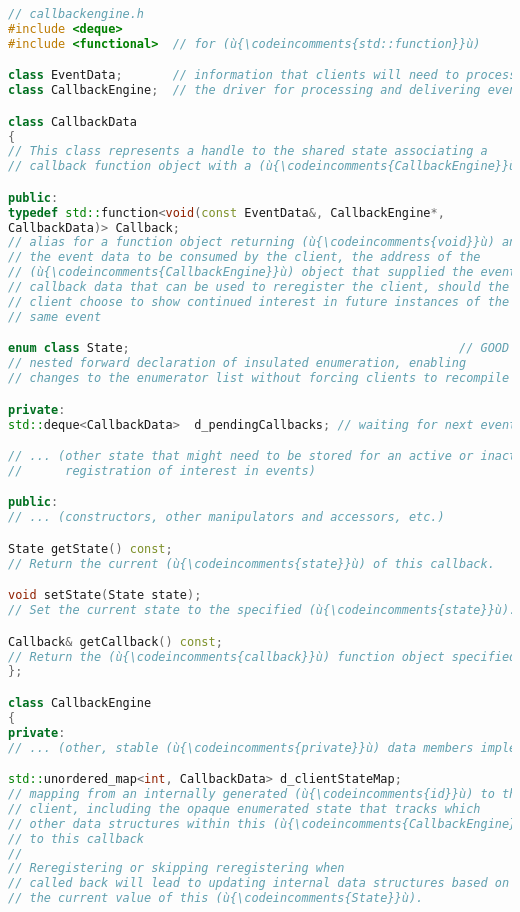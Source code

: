 \begin{lstlisting}[language=C++]
// callbackengine.h
#include <deque>
#include <functional>  // for (ù{\codeincomments{std::function}}ù)

class EventData;       // information that clients will need to process an event
class CallbackEngine;  // the driver for processing and delivering events

class CallbackData
{
// This class represents a handle to the shared state associating a
// callback function object with a (ù{\codeincomments{CallbackEngine}}ù).

public:
typedef std::function<void(const EventData&, CallbackEngine*,
CallbackData)> Callback;
// alias for a function object returning (ù{\codeincomments{void}}ù) and taking, as arguments,
// the event data to be consumed by the client, the address of the
// (ù{\codeincomments{CallbackEngine}}ù) object that supplied the event data, and the
// callback data that can be used to reregister the client, should the
// client choose to show continued interest in future instances of the
// same event

enum class State;                                              // GOOD IDEA
// nested forward declaration of insulated enumeration, enabling
// changes to the enumerator list without forcing clients to recompile

private:
std::deque<CallbackData>  d_pendingCallbacks; // waiting for next event

// ... (other state that might need to be stored for an active or inactive
//      registration of interest in events)

public:
// ... (constructors, other manipulators and accessors, etc.)

State getState() const;
// Return the current (ù{\codeincomments{state}}ù) of this callback.

void setState(State state);
// Set the current state to the specified (ù{\codeincomments{state}}ù).

Callback& getCallback() const;
// Return the (ù{\codeincomments{callback}}ù) function object specified at construction.
};

class CallbackEngine
{
private:
// ... (other, stable (ù{\codeincomments{private}}ù) data members implementing this object)

std::unordered_map<int, CallbackData> d_clientStateMap;
// mapping from an internally generated (ù{\codeincomments{id}}ù) to the full state for a
// client, including the opaque enumerated state that tracks which
// other data structures within this (ù{\codeincomments{CallbackEngine}}ù) have references
// to this callback
//
// Reregistering or skipping reregistering when
// called back will lead to updating internal data structures based on
// the current value of this (ù{\codeincomments{State}}ù).


\end{lstlisting}
